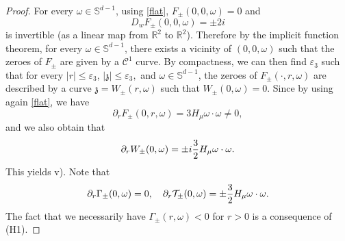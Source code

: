 \documentclass[11pt]{amsart}
\numberwithin{equation}{section}
\newcommand{\eps}{\varepsilon}
\begin{document}
\begin{proof}
For every $\omega \in  \mathbb{S}^{d-1}$,  using  \eqref{flat},    $ F_{\pm} ( 0, 0, \omega)= 0 $ and                                               
  $$D_{w} F _{\pm} ( 0, 0, \omega)= \pm 2 i $$
  is invertible (as a linear map from $\mathbb{R}^2$ to $\mathbb{R}^2$). Therefore by the implicit function theorem, for every $\omega \in   \mathbb{S}^{d-1}$, there exists
    a vicinity of  $(0, 0, \omega)$ such that the zeroes of $F_{\pm}$ are given by a  $\mathscr{C}^1$ curve. 
      By compactness, we can then find $\eps _{3}$
      such that for every  $|r| \leq \eps_{3}$, $ | \mathfrak{z}| \leq \eps_{3},$ and $\omega \in \mathbb{S}^{d-1}$, the zeroes  of $F_\pm(\cdot, r,\omega)$
are described by a curve   $\mathfrak{z} = W_{\pm}(r, \omega)$ such that $W_{\pm}(0, \omega)=0$.
Since by using again \eqref{flat}, we have 
$$\partial_{r}  F_{\pm}( 0, r, \omega)= 3   H_{\mu} \omega \cdot \omega \neq 0, $$
and we also obtain that 
$$ \partial_{r} W_{\pm}(0, \omega) =  \pm i {3 \over 2} H_{\mu} \omega \cdot \omega.$$
This yields v). Note that
 $$ \partial_{r}   \Gamma_{\pm}(0, \omega) = 0, \quad   \partial_{r}   \mathcal{T}_{\pm}(0, \omega) = \pm {  3 \over 2} H_{\mu} \omega \cdot \omega.$$ 
  The fact that we necessarily have  $\Gamma_{\pm}(r, \omega)<0$ for $r>0$ is  a consequence of (H1).
\end{proof}

    
 
\end{document}
